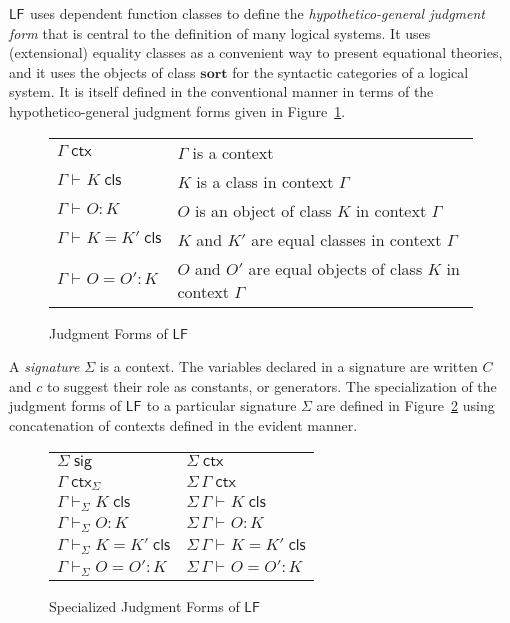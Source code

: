 \documentclass[11pt,twoside]{article}
\newcommand{\LF}[1][]{\ensuremath{\mathsf{LF}_{#1}}}
\newcommand{\sortclass}{\ensuremath{\textbf{sort}}}
\newcommand{\issig}[1]{{#1}\;\mathsf{sig}}
\newcommand{\isctx}[2][]{{#2}\;\mathsf{ctx}_{#1}}
\newcommand{\iscls}[3][]{{#2}\vdash_{#1}{#3}\;\mathsf{cls}}
\newcommand{\eqcls}[4][]{{#2}\vdash_{#1}{#3}={#4}\;\mathsf{cls}}
\newcommand{\isobj}[4][]{{#2}\vdash_{#1}{#3}:{#4}}
\newcommand{\eqobj}[5][]{{#2}\vdash_{#1}{#3}={#4}:{#5}}
\begin{document}
\LF{} uses dependent function classes to define the \emph{hypothetico-general judgment
  form} that is central to the definition of many logical systems.  It uses (extensional)
equality classes as a convenient way to present equational theories, and it uses the
objects of class \sortclass{} for the syntactic categories of a logical system.  It is
itself defined in the conventional manner in terms of the hypothetico-general judgment
forms given in Figure~\ref{fig:lf-judgments}.

\begin{figure}[tp]
  \centering
  \begin{tabular}{l@{\qquad}l}
    $\isctx{\Gamma}$ & $\Gamma$ is a context \\[1ex]
    $\iscls{\Gamma}{K}$ & $K$ is a class in context $\Gamma$ \\
    $\isobj{\Gamma}{O}{K}$ & $O$ is an object of class $K$ in context $\Gamma$ \\[1ex]
    $\eqcls{\Gamma}{K}{K'}$ & $K$ and $K'$ are equal classes in context $\Gamma$ \\
    $\eqobj{\Gamma}{O}{O'}{K}$ & $O$ and $O'$ are equal objects of class $K$ in context $\Gamma$
  \end{tabular}
  \caption{Judgment Forms of \LF{}}
  \label{fig:lf-judgments}
\end{figure}

A \emph{signature} $\Sigma$ is a context.  The variables declared in a signature are written
$C$ and $c$ to suggest their role as constants, or generators.  The specialization of the
judgment forms of \LF{} to a particular signature $\Sigma$ are defined in
Figure~\ref{fig:lf-specialized} using concatenation of contexts defined in the evident
manner.

\begin{figure}[tp]
  \centering
  \begin{tabular}{l@{\qquad\qquad}l}
    $\issig{\Sigma}$             & $\isctx{\Sigma}$ \\[1ex]

    $\isctx[\Sigma]{\Gamma}$           & $\isctx{\Sigma\,\Gamma}$  \\[1ex]
    
    $\iscls[\Sigma]{\Gamma}{K}$           & $\iscls{\Sigma\,\Gamma}{K}$ \\
    $\isobj[\Sigma]{\Gamma}{O}{K}$     & $\isobj{\Sigma\,\Gamma}{O}{K}$ \\[1ex]

    $\eqcls[\Sigma]{\Gamma}{K}{K'}$   & $\eqcls{\Sigma\,\Gamma}{K}{K'}$ \\
    $\eqobj[\Sigma]{\Gamma}{O}{O'}{K}$ & $\eqobj{\Sigma\,\Gamma}{O}{O'}{K}$
  \end{tabular}
  \caption{Specialized Judgment Forms of \LF{}}
  \label{fig:lf-specialized}
\end{figure}
\end{document}
